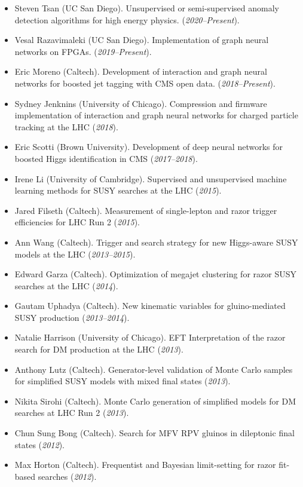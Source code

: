 \documentclass[12pt]{res}
\begin{document}
\begin{resume}
\begin{itemize}
\item Steven Tsan (UC San Diego). Unsupervised or semi-supervised anomaly detection algorithms for high energy physics. (\textit{2020--Present}).
\item Vesal Razavimaleki (UC San Diego). Implementation of graph neural networks on FPGAs. (\textit{2019--Present}).
\item Eric Moreno (Caltech). Development of interaction and graph neural networks for boosted jet tagging with CMS open data. (\textit{2018--Present}).
\item Sydney Jenknins (University of Chicago). Compression and firmware implementation of interaction and graph neural networks for charged particle tracking at the LHC (\textit{2018}).
\item Eric Scotti (Brown University). Development of deep neural networks for boosted Higgs identification in CMS (\textit{2017--2018}).
\item Irene Li (University of Cambridge). Supervised and unsupervised machine learning methods for SUSY searches at the LHC (\textit{2015}).
\item Jared Filseth (Caltech). Measurement of single-lepton and razor trigger efficiencies for LHC Run 2 (\textit{2015}).
\item Ann Wang (Caltech). Trigger and search strategy for new Higgs-aware SUSY models at the LHC (\textit{2013--2015}).
\item Edward Garza (Caltech). Optimization of megajet clustering for razor SUSY searches at the LHC (\textit{2014}).
\item Gautam Uphadya (Caltech). New kinematic variables for gluino-mediated SUSY production (\textit{2013--2014}).
\item Natalie Harrison (University of Chicago). EFT Interpretation of the razor search for DM production at the LHC (\textit{2013}).
\item Anthony Lutz (Caltech). Generator-level validation of Monte Carlo samples for simplified SUSY models with mixed final states (\textit{2013}).
\item Nikita Sirohi (Caltech). Monte Carlo generation of simplified models for DM searches at LHC Run 2 (\textit{2013}).
\item Chun Sung Bong (Caltech). Search for MFV RPV gluinos in dileptonic final states (\textit{2012}).
\item Max Horton (Caltech). Frequentist and Bayesian limit-setting for razor fit-based searches (\textit{2012}).
\end{itemize}


\end{resume}
\end{document}
